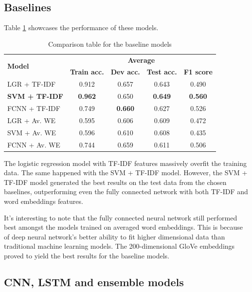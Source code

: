 \documentclass[10pt,conference,compsocconf]{IEEEtran}
\begin{document}
\subsection{Baselines} \label{subsec:baseline_results}

Table \ref{table:baseline_results} showcases the performance of these models.

\begin{table} \centering
\begin{tabular}[c]{ l c c c c}
	\toprule
	\multirow{2}{*}{\textbf{Model}} & \multicolumn{4}{c}{\textbf{Average}} \\
	 & \textbf{Train acc.} & \textbf{Dev acc.} & \textbf{Test acc.} &  \textbf{F1 score} \\
    \midrule
    LGR + TF-IDF & 0.912 & 0.657 & 0.643 & 0.490 \\
    \textbf{SVM + TF-IDF} & \textbf{0.962} & 0.650  & \textbf{0.649} & \textbf{0.560} \\
    FCNN + TF-IDF & 0.749 & \textbf{0.660} & 0.627 & 0.526 \\
    \midrule
    LGR + Av. WE & 0.595 & 0.606 & 0.609 & 0.472 \\
    SVM + Av. WE & 0.596 & 0.610  & 0.608 & 0.435 \\
    FCNN + Av. WE & 0.744 & 0.659 & 0.611 & 0.506 \\
   
    \bottomrule
\end{tabular}
\caption{Comparison table for the baseline models}
\label{table:baseline_results}
\end{table}

The logistic regression model with TF-IDF features massively overfit the training data. The same happened with the SVM + TF-IDF model. However, the SVM + TF-IDF model generated the best results on the test data from the chosen baselines, outperforming even the fully connected network with both TF-IDF and word embeddings features. 

It's interesting to note that the fully connected neural network still performed best amongst the models trained on averaged word embeddings. This is because of deep neural network's better ability to fit higher dimensional data than traditional machine learning models. The 200-dimensional GloVe embeddings proved to yield the best results for the baseline models.

\subsection{CNN, LSTM and ensemble models} \label{subsec:cnn_lstm_results}
\end{document}
